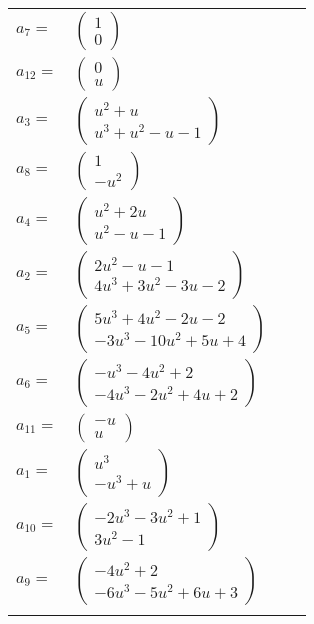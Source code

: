 \documentclass[1p]{elsarticle_modified}
\theoremstyle{definition}
\begin{document}
\begin{tabular}{m{7pt} m{180pt} m{7pt} m{180pt} }
\flushright $a_{7}=$&$\begin{pmatrix}1\\0\end{pmatrix}$ \\
\flushright $a_{12}=$&$\begin{pmatrix}0\\u\end{pmatrix}$ \\
\flushright $a_{3}=$&$\begin{pmatrix}u^2+u\\u^3+u^2- u-1\end{pmatrix}$ \\
\flushright $a_{8}=$&$\begin{pmatrix}1\\- u^2\end{pmatrix}$ \\
\flushright $a_{4}=$&$\begin{pmatrix}u^2+2 u\\u^2- u-1\end{pmatrix}$ \\
\flushright $a_{2}=$&$\begin{pmatrix}2 u^2- u-1\\4 u^3+3 u^2-3 u-2\end{pmatrix}$ \\
\flushright $a_{5}=$&$\begin{pmatrix}5 u^3+4 u^2-2 u-2\\-3 u^3-10 u^2+5 u+4\end{pmatrix}$ \\
\flushright $a_{6}=$&$\begin{pmatrix}- u^3-4 u^2+2\\-4 u^3-2 u^2+4 u+2\end{pmatrix}$ \\
\flushright $a_{11}=$&$\begin{pmatrix}- u\\u\end{pmatrix}$ \\
\flushright $a_{1}=$&$\begin{pmatrix}u^3\\- u^3+u\end{pmatrix}$ \\
\flushright $a_{10}=$&$\begin{pmatrix}-2 u^3-3 u^2+1\\3 u^2-1\end{pmatrix}$ \\
\flushright $a_{9}=$&$\begin{pmatrix}-4 u^2+2\\-6 u^3-5 u^2+6 u+3\end{pmatrix}$\\&\end{tabular}
\end{document}
